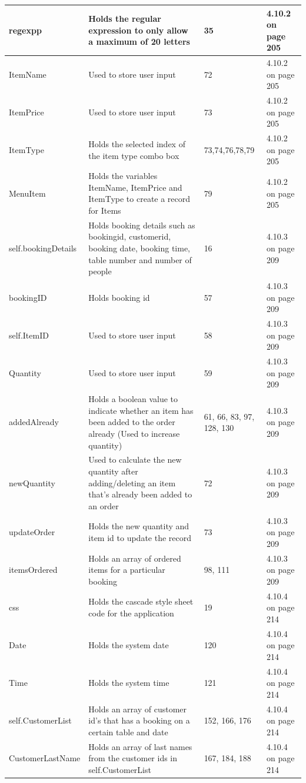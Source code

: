 \begin{center}
\begin{longtable}{|p{3cm}|p{4.5cm}|p{3cm}|p{1cm}|}
regexpp& Holds the regular expression to only allow a maximum of 20 letters & 35 &4.10.2 on page 205 \\ \hline
ItemName & Used to store user input & 72 &4.10.2 on page 205 \\ \hline
ItemPrice & Used to store user input & 73 &4.10.2 on page 205 \\ \hline
ItemType & Holds the selected index of the item type combo box & 73,74,76,78,79 &4.10.2 on page 205 \\ \hline
MenuItem & Holds the variables ItemName, ItemPrice and ItemType to create a record for Items & 79 &4.10.2 on page 205\\ \hline
self.bookingDetails & Holds booking details such as bookingid, customerid, booking date, booking time, table number and number of people & 16&4.10.3 on page 209 \\ \hline
bookingID & Holds booking id & 57 &4.10.3 on page 209 \\ \hline
self.ItemID & Used to store user input & 58 &4.10.3 on page 209 \\ \hline
Quantity & Used to store user input & 59 & 4.10.3 on page 209\\ \hline
addedAlready & Holds a boolean value to indicate whether an item has been added to the order already (Used to increase quantity) & 61, 66, 83, 97, 128, 130 &4.10.3 on page 209 \\ \hline
newQuantity & Used to calculate the new quantity after adding/deleting an item that's already been added to an order & 72 & 4.10.3 on page 209\\ \hline
updateOrder & Holds the new quantity and item id to update the record & 73 &4.10.3  on page 209\\ \hline
itemsOrdered & Holds an array of ordered items for a particular booking & 98, 111&4.10.3 on page 209 \\ \hline
css & Holds the cascade style sheet code for the application&19 &4.10.4 on page 214 \\ \hline
Date & Holds the system date & 120 &4.10.4 on page 214 \\ \hline
Time & Holds the system time & 121 &4.10.4 on page 214 \\ \hline
self.CustomerList & Holds an array of customer id's that has a booking on a certain table and date & 152, 166, 176 &4.10.4 on page 214 \\ \hline
CustomerLastName & Holds an array of last names from the customer ids in self.CustomerList & 167, 184, 188 &4.10.4 on page 214 \\ \hline

\end{longtable}
\end{center}
